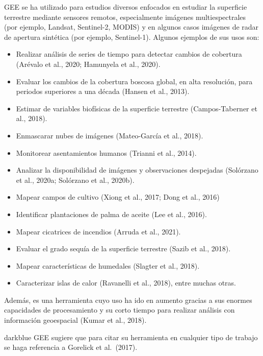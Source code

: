 \documentclass[
  12pt,
  letterpaper,
  twoside]{book}
\providecommand{\tightlist}{%
  \setlength{\itemsep}{0pt}\setlength{\parskip}{0pt}}
\begin{document}
GEE se ha utilizado para estudios diversos enfocados en estudiar la superficie terrestre mediante sensores remotos, especialmente imágenes multiespectrales (por ejemplo, Landsat, Sentinel-2, MODIS) y en algunos casos imágenes de radar de apertura sintética (por ejemplo, Sentinel-1). Algunos ejemplos de sus usos son:

\begin{itemize}
\tightlist
\item
  Realizar análisis de series de tiempo para detectar cambios de cobertura (Arévalo et al., 2020; Hamunyela et al., 2020).
\item
  Evaluar los cambios de la cobertura boscosa global, en alta resolución, para periodos superiores a una década (Hansen et al., 2013).
\item
  Estimar de variables biofísicas de la superficie terrestre (Campos-Taberner et al., 2018).
\item
  Enmascarar nubes de imágenes (Mateo-García et al., 2018).
\item
  Monitorear asentamientos humanos (Trianni et al., 2014).
\item
  Analizar la disponibilidad de imágenes y observaciones despejadas (Solórzano et al., 2020a; Solórzano et al., 2020b).
\item
  Mapear campos de cultivo (Xiong et al., 2017; Dong et al., 2016)
\item
  Identificar plantaciones de palma de aceite (Lee et al., 2016).
\item
  Mapear cicatrices de incendios (Arruda et al., 2021).
\item
  Evaluar el grado sequía de la superficie terrestre (Sazib et al., 2018).
\item
  Mapear características de humedales (Slagter et al., 2018).
\item
  Caracterizar islas de calor (Ravanelli et al., 2018), entre muchas otras.
\end{itemize}

Además, es una herramienta cuyo uso ha ido en aumento gracias a sus enormes capacidades de procesamiento y su corto tiempo para realizar análisis con información geoespacial (Kumar et al., 2018).

\begin{bluebox2}

\begin{awesomeblock}{5pt}{\faLightbulb}{darkblue}
GEE sugiere que para citar su herramienta en cualquier tipo de trabajo se haga referencia a Gorelick et al.~(2017).

\end{awesomeblock}

\end{bluebox2}
\end{document}
